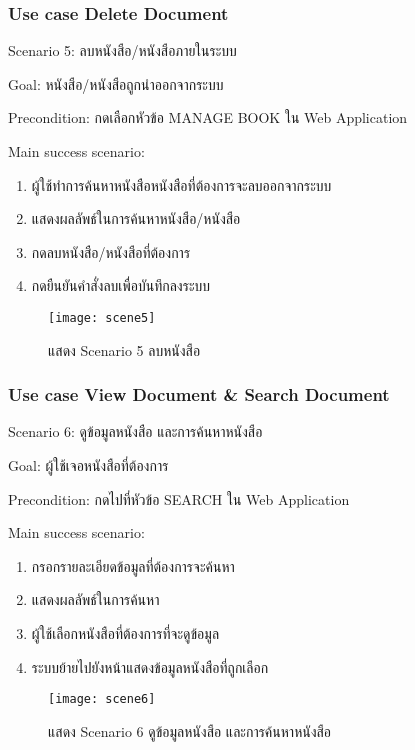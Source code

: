 \subsubsection{Use case Delete Document}

Scenario 5: ลบหนังสือ/หนังสือภายในระบบ

Goal: หนังสือ/หนังสือถูกนำออกจากระบบ

Precondition: กดเลือกหัวข้อ MANAGE BOOK ใน Web Application

Main success scenario:

\begin{enumerate}
    \item ผู้ใช้ทำการค้นหาหนังสือหนังสือที่ต้องการจะลบออกจากระบบ
    \item แสดงผลลัพธ์ในการค้นหาหนังสือ/หนังสือ
    \item กดลบหนังสือ/หนังสือที่ต้องการ
    \item กดยืนยันคำสั่งลบเพื่อบันทึกลงระบบ
\end{enumerate}
\begin{figure}[H]
    \centering
    \texttt{[image: scene5]}
    \caption{แสดง Scenario 5 ลบหนังสือ}\label{fig:scene5}
\end{figure}

\subsubsection{Use case View Document \& Search Document}

Scenario 6: ดูข้อมูลหนังสือ และการค้นหาหนังสือ

Goal: ผู้ใช้เจอหนังสือที่ต้องการ

Precondition: กดไปที่หัวข้อ SEARCH ใน Web Application

Main success scenario:

\begin{enumerate}
    \item กรอกรายละเอียดข้อมูลที่ต้องการจะค้นหา
    \item แสดงผลลัพธ์ในการค้นหา
    \item ผู้ใช้เลือกหนังสือที่ต้องการที่จะดูข้อมูล
    \item ระบบย้ายไปยังหน้าแสดงข้อมูลหนังสือที่ถูกเลือก
\end{enumerate}
\begin{figure}[H]
    \centering
    \texttt{[image: scene6]}
    \caption{แสดง Scenario 6 ดูข้อมูลหนังสือ และการค้นหาหนังสือ}\label{fig:scene6}
\end{figure}


